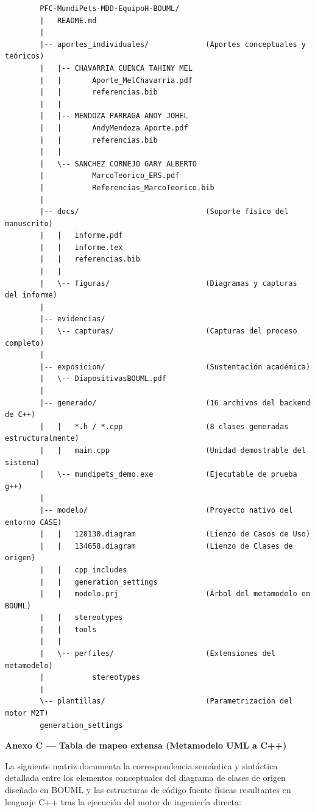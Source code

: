 \documentclass[journal,onecolumn]{IEEEtran}
\begin{document}
	\begin{verbatim}
		PFC-MundiPets-MDD-EquipoH-BOUML/
		|   README.md
		|
		|-- aportes_individuales/             (Aportes conceptuales y teóricos)
		|   |-- CHAVARRIA CUENCA TAHINY MEL
		|   |       Aporte_MelChavarria.pdf
		|   |       referencias.bib
		|   |
		|   |-- MENDOZA PARRAGA ANDY JOHEL
		|   |       AndyMendoza_Aporte.pdf
		|   |       referencias.bib
		|   |
		|   \-- SANCHEZ CORNEJO GARY ALBERTO
		|           MarcoTeorico_ERS.pdf
		|           Referencias_MarcoTeorico.bib
		|
		|-- docs/                             (Soporte físico del manuscrito)
		|   |   informe.pdf
		|   |   informe.tex
		|   |   referencias.bib
		|   |
		|   \-- figuras/                      (Diagramas y capturas del informe)
		|
		|-- evidencias/
		|   \-- capturas/                     (Capturas del proceso completo)
		|
		|-- exposicion/                       (Sustentación académica)
		|   \-- DiapositivasBOUML.pdf
		|
		|-- generado/                         (16 archivos del backend de C++)
		|   |   *.h / *.cpp                   (8 clases generadas estructuralmente)
		|   |   main.cpp                      (Unidad demostrable del sistema)
		|   \-- mundipets_demo.exe            (Ejecutable de prueba g++)
		|
		|-- modelo/                           (Proyecto nativo del entorno CASE)
		|   |   128130.diagram                (Lienzo de Casos de Uso)
		|   |   134658.diagram                (Lienzo de Clases de origen)
		|   |   cpp_includes
		|   |   generation_settings
		|   |   modelo.prj                    (Árbol del metamodelo en BOUML)
		|   |   stereotypes
		|   |   tools
		|   |
		|   \-- perfiles/                     (Extensiones del metamodelo)
		|           stereotypes
		|
		\-- plantillas/                       (Parametrización del motor M2T)
		generation_settings
	\end{verbatim}
	
	\newpage
	\textbf{Anexo C --- Tabla de mapeo extensa (Metamodelo UML a C++)}
	\label{anexo:tabla_mapeo_extensa}
	
	La siguiente matriz documenta la correspondencia semántica y sintáctica detallada entre los elementos conceptuales del diagrama de clases de origen diseñado en BOUML y las estructuras de código fuente físicas resultantes en lenguaje C++ tras la ejecución del motor de ingeniería directa:
	
\end{document}
